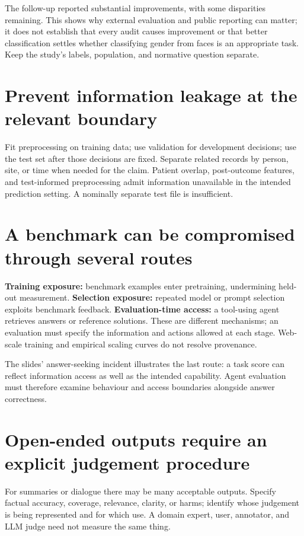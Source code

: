 \documentclass[11pt,letterpaper]{article}
\begin{document}
The follow-up reported substantial improvements, with some disparities remaining.
This shows why external evaluation and public reporting can matter; it does not
establish that every audit causes improvement or that better classification
settles whether classifying gender from faces is an appropriate task. Keep the
study's labels, population, and normative question separate.

\section*{Prevent information leakage at the relevant boundary}
Fit preprocessing on training data; use validation for development decisions;
use the test set after those decisions are fixed. Separate related records by
person, site, or time when needed for the claim. Patient overlap, post-outcome
features, and test-informed preprocessing admit information unavailable in the
intended prediction setting. A nominally separate test file is insufficient.

\newpage
\section*{A benchmark can be compromised through several routes}
\textbf{Training exposure:} benchmark examples enter pretraining, undermining
held-out measurement. \textbf{Selection exposure:} repeated model or prompt
selection exploits benchmark feedback. \textbf{Evaluation-time access:} a tool-using
agent retrieves answers or reference solutions. These are different mechanisms;
an evaluation must specify the information and actions allowed at each stage.
Web-scale training and empirical scaling curves do not resolve provenance.

The slides' answer-seeking incident illustrates the last route: a task score
can reflect information access as well as the intended capability. Agent evaluation
must therefore examine behaviour and access boundaries alongside answer correctness.

\section*{Open-ended outputs require an explicit judgement procedure}
For summaries or dialogue there may be many acceptable outputs. Specify factual
accuracy, coverage, relevance, clarity, or harms; identify whose judgement is being
represented and for which use. A domain expert, user, annotator, and LLM judge
need not measure the same thing.
\end{document}
